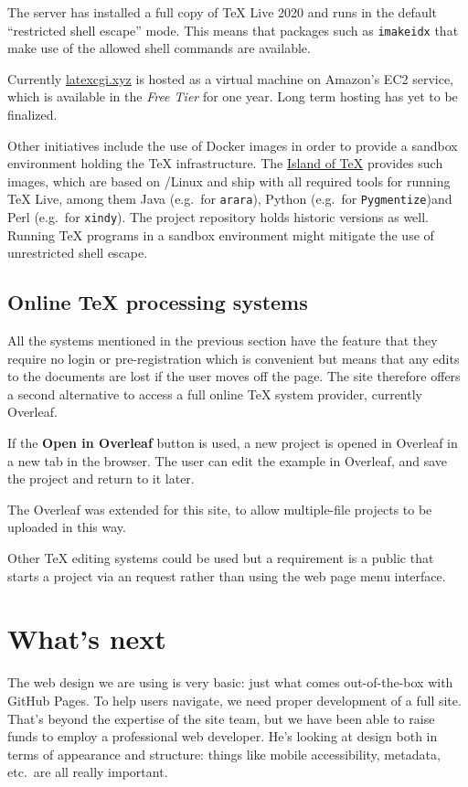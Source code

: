 \documentclass[harvardcite]{ltugboat}
\begin{document}
The server has installed a full copy of \TeX{} Live 2020 and runs in
the default \enquote{restricted shell escape} mode. This means that packages
 such as \texttt{imakeidx} that make use of the allowed shell commands
are available.

Currently \url{latexcgi.xyz} is hosted as a virtual machine on
Amazon's EC2 service, which is available in the \emph{Free Tier} for one
year. Long term hosting has yet to be finalized.

Other initiatives include the use of Docker images in order to provide
a sandbox environment holding the \TeX{} infrastructure. The
\href{https://gitlab.com/islandoftex/images}{Island of \TeX{}} provides
such images, which are based on /Linux and ship with all required
tools for running \TeX{} Live, among them Java (e.g.\ for \texttt{arara}),
Python (e.g.\ for \texttt{Pygmentize})and Perl (e.g.\ for \texttt{xindy}).
The project repository holds historic versions as well. Running \TeX{} programs
in a sandbox environment might mitigate the use of unrestricted shell escape.

\subsection{Online \TeX{} processing systems}

All the systems mentioned in the previous section have the feature that
they require no login or pre-registration which is convenient but
means that any edits to the documents are lost if the user moves off
the page.  The site therefore offers a second alternative to access a
full online \TeX{} system provider, currently Overleaf.

If the \textbf{Open in Overleaf} button is used, a new project is
opened in Overleaf in a new tab in the browser. The user can edit the
example in Overleaf, and save the project and return to it later.

The Overleaf  was extended for this site, to allow multiple-file
projects to be uploaded in this way.

Other \TeX{} editing systems could be used but a requirement is a
public  that starts a project via an  request rather than using
the web page menu interface.


\section{What's next}

The web design we are using is very basic: just what comes out-of-the-box with
GitHub Pages. To help users navigate, we need proper development of a full
site. That's beyond the expertise of the site team, but we have been able to
raise funds to employ a professional web developer. He's looking at design both
in terms of appearance and structure: things like mobile accessibility,
metadata, etc.\ are all really important.
\end{document}
